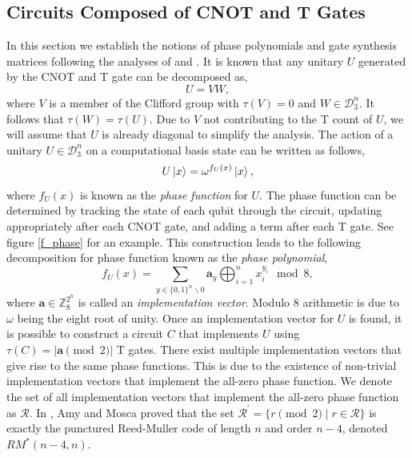 \documentclass{article}
\theoremstyle{definition}
\theoremstyle{problem}
\theoremstyle{lemma}
\begin{document}
		\subsection{Circuits Composed of CNOT and T Gates}
	In this section we establish the notions of phase polynomials and gate synthesis matrices following the analyses of \cite{8_Amy_2016} and \cite{1_Campbell_2017}.
	It is known that any unitary $U$ generated by the CNOT and T gate can be decomposed as,
	\begin{equation}
	U = VW,
	\end{equation}
	where $V$ is a member of the Clifford group with $\tau(V)=0$ and $W \in \mathcal{D}_3^n$. It follows that $\tau(W) = \tau(U)$. Due to $V$ not contributing to the T count of $U$, we will assume that $U$ is already diagonal to simplify the analysis.	
	The action of a unitary $U \in \mathcal{D}_3^n$ on a computational basis state can be written as follows,
	\begin{equation}
	U\left\vert{x}\right\rangle = \omega^{f_U(x)}\left\vert{x}\right\rangle,
	\end{equation}
	where $f_U(x)$ is known as the \emph{phase function} for $U$. The phase function can be determined by tracking the state of each qubit through the circuit, updating appropriately after each CNOT gate, and adding a term after each T gate. See figure \ref{f_phase} for an example. This construction leads to the following decomposition for phase function known as the \emph{phase polynomial},
	\begin{equation}
	f_U(x) = \sum_{y\in\{0,1\}^n\backslash 0} \mathbf{a}_y \bigoplus_{i=1}^n x_i^{y_i}\mod 8,
	\end{equation}
	where $\mathbf{a}\in \mathbb{Z}_8^{2^n}$ is called an \emph{implementation vector}. Modulo 8 arithmetic is due to $\omega$ being the eight root of unity. Once an implementation vector for $U$ is found, it is possible to construct a circuit $C$ that implements $U$ using $\tau(C) = |\mathbf{a} \pmod{2}|$ T gates. There exist multiple implementation vectors that give rise to the same phase functions. This is due to the existence of non-trivial implementation vectors that implement the all-zero phase function. We denote the set of all implementation vectors that implement the all-zero phase function as $\mathcal{R}$. In \cite{8_Amy_2016}, Amy and Mosca proved that the set $\mathcal{R}^\prime = \{r \pmod{2} \mid r \in \mathcal{R}\}$ is exactly the punctured Reed-Muller code of length $n$ and order $n-4$, denoted $RM^*(n-4,n)$.
	
	
	
\end{document}
